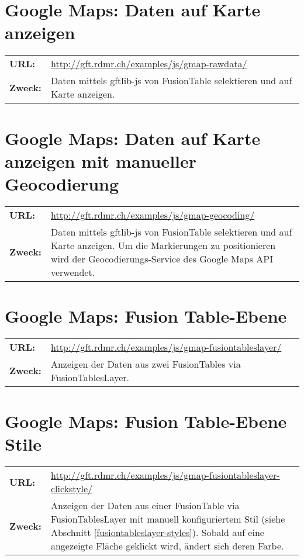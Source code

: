 \section{Google Maps: Daten auf Karte anzeigen}
\begin{tabular}{lp{12cm}}
\textbf{URL:} & \url{http://gft.rdmr.ch/examples/js/gmap-rawdata/} \\ 
\textbf{Zweck:} & Daten mittels gftlib-js von FusionTable selektieren und auf Karte anzeigen. \\ 
\end{tabular} 

\section{Google Maps: Daten auf Karte anzeigen mit manueller Geocodierung}
\begin{tabular}{lp{12cm}}
\textbf{URL:} & \url{http://gft.rdmr.ch/examples/js/gmap-geocoding/} \\ 
\textbf{Zweck:} & Daten mittels gftlib-js von FusionTable selektieren und auf Karte anzeigen. Um die Markierungen zu positionieren wird der Geocodierungs-Service des Google Maps API verwendet.  \\ 
\end{tabular} 

\section{Google Maps: Fusion Table-Ebene}
\begin{tabular}{lp{12cm}}
\textbf{URL:} & \url{http://gft.rdmr.ch/examples/js/gmap-fusiontableslayer/} \\ 
\textbf{Zweck:} & Anzeigen der Daten aus zwei FusionTables via FusionTablesLayer.  \\ 
\end{tabular} 

\section{Google Maps: Fusion Table-Ebene Stile}
\begin{tabular}{lp{12cm}}
\textbf{URL:} & \url{http://gft.rdmr.ch/examples/js/gmap-fusiontableslayer-clickstyle/} \\ 
\textbf{Zweck:} & Anzeigen der Daten aus einer FusionTable via FusionTablesLayer mit manuell konfiguriertem Stil (siehe Abschnitt \ref{fusiontableslayer-styles}). Sobald auf eine angezeigte Fläche geklickt wird, ändert sich deren Farbe. \\ 
\end{tabular} 

